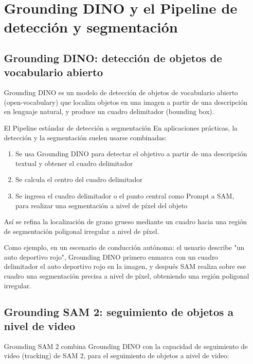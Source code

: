 \section{Grounding DINO y el Pipeline de detección y segmentación}

\subsection{Grounding DINO: detección de objetos de vocabulario abierto}

Grounding DINO es un modelo de detección de objetos de vocabulario abierto (open-vocabulary) que localiza objetos en una imagen a partir de una descripción en lenguaje natural, y produce un cuadro delimitador (bounding box).

\begin{importantbox}{El Pipeline estándar de detección a segmentación}
En aplicaciones prácticas, la detección y la segmentación suelen usarse combinadas:
\begin{enumerate}
    \item Se usa Grounding DINO para detectar el objetivo a partir de una descripción textual y obtener el cuadro delimitador
    \item Se calcula el centro del cuadro delimitador
    \item Se ingresa el cuadro delimitador o el punto central como Prompt a SAM, para realizar una segmentación a nivel de píxel del objeto
\end{enumerate}
Así se refina la localización de grano grueso mediante un cuadro hacia una región de segmentación poligonal irregular a nivel de píxel.
\end{importantbox}

Como ejemplo, en un escenario de conducción autónoma: el usuario describe "un auto deportivo rojo", Grounding DINO primero enmarca con un cuadro delimitador el auto deportivo rojo en la imagen, y después SAM realiza sobre ese cuadro una segmentación precisa a nivel de píxel, obteniendo una región poligonal irregular.

\subsection{Grounding SAM 2: seguimiento de objetos a nivel de video}

Grounding SAM 2 combina Grounding DINO con la capacidad de seguimiento de video (tracking) de SAM 2, para el seguimiento de objetos a nivel de video:

